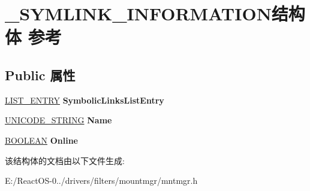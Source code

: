 \hypertarget{struct___s_y_m_l_i_n_k___i_n_f_o_r_m_a_t_i_o_n}{}\section{\+\_\+\+S\+Y\+M\+L\+I\+N\+K\+\_\+\+I\+N\+F\+O\+R\+M\+A\+T\+I\+O\+N结构体 参考}
\label{struct___s_y_m_l_i_n_k___i_n_f_o_r_m_a_t_i_o_n}
\subsection*{Public 属性}
\begin{DoxyCompactItemize}
\item 
\mbox{\label{struct___s_y_m_l_i_n_k___i_n_f_o_r_m_a_t_i_o_n_a763b96f2510e72788ea9adb0cd91c295}} 
\hyperlink{struct___l_i_s_t___e_n_t_r_y}{L\+I\+S\+T\+\_\+\+E\+N\+T\+RY} {\bfseries Symbolic\+Links\+List\+Entry}
\item 
\mbox{\label{struct___s_y_m_l_i_n_k___i_n_f_o_r_m_a_t_i_o_n_a3ed88ead141145debf5c91d7dce48986}} 
\hyperlink{struct___u_n_i_c_o_d_e___s_t_r_i_n_g}{U\+N\+I\+C\+O\+D\+E\+\_\+\+S\+T\+R\+I\+NG} {\bfseries Name}
\item 
\mbox{\label{struct___s_y_m_l_i_n_k___i_n_f_o_r_m_a_t_i_o_n_a5928993d6ddc50cc7ed23a7a024c0866}} 
\hyperlink{_processor_bind_8h_a112e3146cb38b6ee95e64d85842e380a}{B\+O\+O\+L\+E\+AN} {\bfseries Online}
\end{DoxyCompactItemize}


该结构体的文档由以下文件生成\+:\begin{DoxyCompactItemize}
\item 
E\+:/\+React\+O\+S-\/0../drivers/filters/mountmgr/mntmgr.\+h\end{DoxyCompactItemize}
